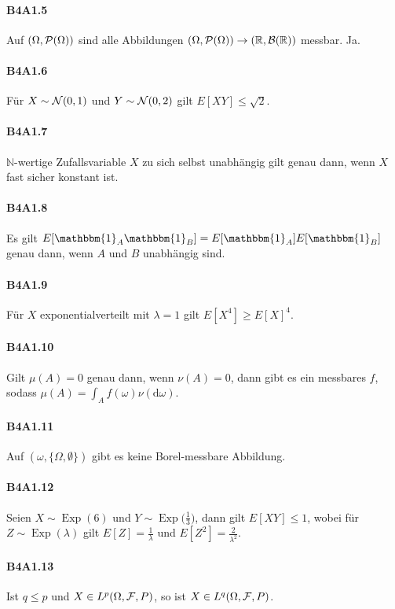 \documentclass{article}
\begin{document}
\paragraph{B4A1.5}
Auf $(\Omega,{\cal P}(\Omega))$ sind alle Abbildungen $(\Omega,{\cal P}(\Omega))\to(\mathbb{R},{\cal B}(\mathbb{R}))$ messbar.
Ja.

\paragraph{B4A1.6}
Für $X\sim{\cal N}(0,1)$ und $Y\sim{\cal N}(0,2)$ gilt $E[XY]\leq\sqrt{2}$.
\paragraph{B4A1.7}
$\mathbb{N}$-wertige Zufallsvariable $X$ zu sich selbst unabhängig gilt genau dann, wenn $X$ fast sicher konstant ist.
\paragraph{B4A1.8}
Es gilt $E[\mathbbm{1}_A\mathbbm{1}_B]=E[\mathbbm{1}_A]E[\mathbbm{1}_B]$ genau dann, wenn $A$ und $B$ unabhängig sind.
\paragraph{B4A1.9}
Für $X$ exponentialverteilt mit $\lambda=1$ gilt $E[X^4]\geq E[X]^4$.
\paragraph{B4A1.10}
Gilt $\mu(A)=0$ genau dann, wenn $\nu(A)=0$, dann gibt es ein messbares $f$, sodass $\mu(A)=\int_A f(\omega)\nu(\mathrm{d}\omega)$.
\paragraph{B4A1.11}
Auf $(\omega,\{\Omega,\emptyset\})$ gibt es keine Borel-messbare Abbildung.
\paragraph{B4A1.12}
Seien $X\sim\operatorname{Exp}(6)$ und $Y\sim\operatorname{Exp}\bigl(\frac{1}{3}\bigr)$, dann gilt $E[XY]\leq1$, wobei für $Z\sim\operatorname{Exp}(\lambda)$ gilt $E[Z]=\frac{1}{\lambda}$ und $E[Z^2]=\frac{2}{\lambda^2}$.
\paragraph{B4A1.13}
Ist $q\leq p$ und $X\in L^p(\Omega,{\cal F},P)$, so ist $X\in L^q(\Omega,{\cal F},P)$.
\newpage
\end{document}
